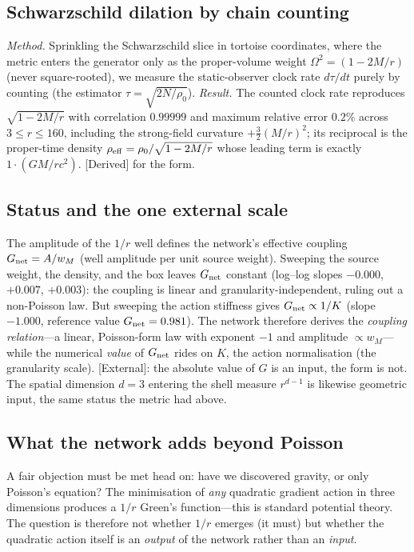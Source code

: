 \documentclass[aps,prd,reprint,nofootinbib,superscriptaddress,floatfix]{revtex4-2}
\theoremstyle{plain}
\newcommand{\Sderiv}{\textsf{[Derived]}}
\newcommand{\Sext}{\textsf{[External]}}
\begin{document}
\subsection{Schwarzschild dilation by chain counting}
\emph{Method.} Sprinkling the Schwarzschild slice in tortoise coordinates, where the
metric enters the generator only as the proper-volume weight $\Omega^2=(1-2M/r)$
(never square-rooted), we measure the static-observer clock rate $d\tau/dt$ purely by
counting (the estimator $\tau=\sqrt{2N/\rho_0}$). \emph{Result.} The counted clock
rate reproduces $\sqrt{1-2M/r}$ with correlation $0.99999$ and maximum relative error
$0.2\%$ across $3\le r\le160$, including the strong-field curvature $+\tfrac32
(M/r)^2$; its reciprocal is the proper-time density $\rho_{\rm eff}=\rho_0/
\sqrt{1-2M/r}$ whose leading term is exactly $1\cdot(GM/rc^2)$. \Sderiv{} for the
form.

\subsection{Status and the one external scale}
The amplitude of the $1/r$ well defines the network's effective coupling
$G_{\rm net}=A/w_M$ (well amplitude per unit source weight). Sweeping the source
weight, the density, and the box leaves $G_{\rm net}$ constant (log--log slopes
$-0.000$, $+0.007$, $+0.003$): the coupling is linear and granularity-independent,
ruling out a non-Poisson law. But sweeping the action stiffness gives
$G_{\rm net}\propto1/K$ (slope $-1.000$, reference value $G_{\rm net}=0.981$). The
network therefore derives the \emph{coupling relation}---a linear, Poisson-form law
with exponent $-1$ and amplitude $\propto w_M$---while the numerical \emph{value} of
$G_{\rm net}$ rides on $K$, the action normalisation (the granularity scale).
\Sext{}: the absolute value of $G$ is an input, the form is not. The spatial
dimension $d=3$ entering the shell measure $r^{d-1}$ is likewise geometric input, the
same status the metric had above.

\subsection{What the network adds beyond Poisson}\label{sec:beyondpoisson}

A fair objection must be met head on: have we discovered gravity, or only Poisson's
equation? The minimisation of \emph{any} quadratic gradient action in three
dimensions produces a $1/r$ Green's function---this is standard potential theory. The
question is therefore not whether $1/r$ emerges (it must) but whether the quadratic
action itself is an \emph{output} of the network rather than an \emph{input}.
\end{document}
